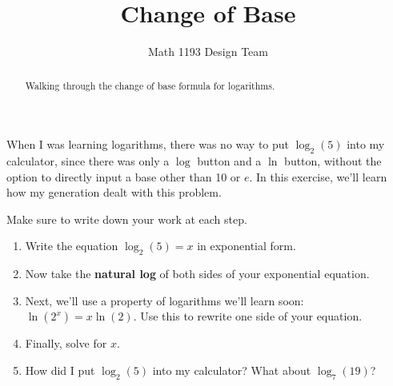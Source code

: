 \documentclass[noauthor]{ximera}
\title{Change of Base}
\author{Math 1193 Design Team}
\begin{document}
\begin{abstract}
    Walking through the change of base formula for logarithms.
\end{abstract}
\maketitle

When I was learning logarithms, there was no way to put \(\log_2(5)\)
into my calculator, since there was only a \(\log\) button and a
\(\ln\) button, without the option to directly input a base other
than 10 or \(e\). In this exercise, we'll learn how my generation
dealt with this problem. 

Make sure to write down your work at each step.

\begin{enumerate}
    \item Write the equation \(\log_2(5) = x\) in exponential form.
    \item Now take the \textbf{natural log} of both sides of your
    exponential equation.
    \item Next, we'll use a property of logarithms we'll learn soon:
    \(\ln(2^x) = x \ln(2)\). Use this to rewrite one side of your equation.
    \item Finally, solve for \(x\).
    \item How did I put \(\log_2(5)\) into my calculator? What about
    \(\log_7(19)\)?
\end{enumerate}
\end{document}
